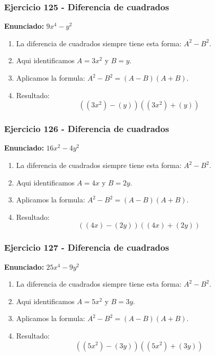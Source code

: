 \documentclass[11pt,a4paper]{article}
\begin{document}
\vspace{0.2cm}
\subsubsection*{Ejercicio 125 - Diferencia de cuadrados}
\textbf{Enunciado:} $ 9 x^{4} - y^{2} $\par
\begin{enumerate}[leftmargin=2em]
\item La diferencia de cuadrados siempre tiene esta forma: \(A^2-B^2\).
\item Aqui identificamos \(A=3 x^{2}\) y \(B=y\).
\item Aplicamos la formula: \(A^2-B^2=(A-B)(A+B)\).
\item Resultado: \[\boxed{\left(\left(3 x^{2}\right)-\left(y\right)\right)\left(\left(3 x^{2}\right)+\left(y\right)\right)}\]
\end{enumerate}

\vspace{0.2cm}
\subsubsection*{Ejercicio 126 - Diferencia de cuadrados}
\textbf{Enunciado:} $ 16 x^{2} - 4 y^{2} $\par
\begin{enumerate}[leftmargin=2em]
\item La diferencia de cuadrados siempre tiene esta forma: \(A^2-B^2\).
\item Aqui identificamos \(A=4 x\) y \(B=2 y\).
\item Aplicamos la formula: \(A^2-B^2=(A-B)(A+B)\).
\item Resultado: \[\boxed{\left(\left(4 x\right)-\left(2 y\right)\right)\left(\left(4 x\right)+\left(2 y\right)\right)}\]
\end{enumerate}

\vspace{0.2cm}
\subsubsection*{Ejercicio 127 - Diferencia de cuadrados}
\textbf{Enunciado:} $ 25 x^{4} - 9 y^{2} $\par
\begin{enumerate}[leftmargin=2em]
\item La diferencia de cuadrados siempre tiene esta forma: \(A^2-B^2\).
\item Aqui identificamos \(A=5 x^{2}\) y \(B=3 y\).
\item Aplicamos la formula: \(A^2-B^2=(A-B)(A+B)\).
\item Resultado: \[\boxed{\left(\left(5 x^{2}\right)-\left(3 y\right)\right)\left(\left(5 x^{2}\right)+\left(3 y\right)\right)}\]
\end{enumerate}
\end{document}
